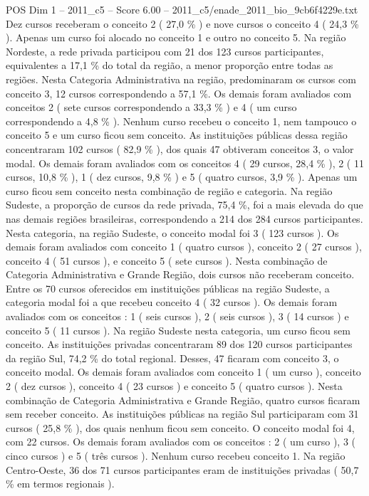 \begin{textsample}{POS Dim 1 – 2011\_c5 – Score 6.00 – 2011\_c5/enade\_2011\_bio\_9cb6f4229e.txt}
Dez cursos receberam o conceito 2 ( 27,0 \% ) e nove cursos o conceito 4 ( 24,3 \% ).
Apenas um curso foi alocado no conceito 1 e outro no conceito 5.
Na região Nordeste, a rede privada participou com 21 dos 123 cursos participantes, equivalentes a 17,1 \% do total da região, a menor proporção entre todas as regiões.
Nesta Categoria Administrativa na região, predominaram os cursos com conceito 3, 12 cursos correspondendo a 57,1 \%.
Os demais foram avaliados com conceitos 2 ( sete cursos correspondendo a 33,3 \% ) e 4 ( um curso correspondendo a 4,8 \% ).
Nenhum curso recebeu o conceito 1, nem tampouco o conceito 5 e um curso ficou sem conceito.
As instituições públicas dessa região concentraram 102 cursos ( 82,9 \% ), dos quais 47 obtiveram conceitos 3, o valor modal.
Os demais foram avaliados com os conceitos 4 ( 29 cursos, 28,4 \% ), 2 ( 11 cursos, 10,8 \% ), 1 ( dez cursos, 9,8 \% ) e 5 ( quatro cursos, 3,9 \% ).
Apenas um curso ficou sem conceito nesta combinação de região e categoria.
Na região Sudeste, a proporção de cursos da rede privada, 75,4 \%, foi a mais elevada do que nas demais regiões brasileiras, correspondendo a 214 dos 284 cursos participantes.
Nesta categoria, na região Sudeste, o conceito modal foi 3 ( 123 cursos ).
Os demais foram avaliados com conceito 1 ( quatro cursos ), conceito 2 ( 27 cursos ), conceito 4 ( 51 cursos ), e conceito 5 ( sete cursos ).
Nesta combinação de Categoria Administrativa e Grande Região, dois cursos não receberam conceito.
Entre os 70 cursos oferecidos em instituições públicas na região Sudeste, a categoria modal foi a que recebeu conceito 4 ( 32 cursos ).
Os demais foram avaliados com os conceitos : 1 ( seis cursos ), 2 ( seis cursos ), 3 ( 14 cursos ) e conceito 5 ( 11 cursos ).
Na região Sudeste nesta categoria, um curso ficou sem conceito.
As instituições privadas concentraram 89 dos 120 cursos participantes da região Sul, 74,2 \% do total regional.
Desses, 47 ficaram com conceito 3, o conceito modal.
Os demais foram avaliados com conceito 1 ( um curso ), conceito 2 ( dez cursos ), conceito 4 ( 23 cursos ) e conceito 5 ( quatro cursos ).
Nesta combinação de Categoria Administrativa e Grande Região, quatro cursos ficaram sem receber conceito.
As instituições públicas na região Sul participaram com 31 cursos ( 25,8 \% ), dos quais nenhum ficou sem conceito.
O conceito modal foi 4, com 22 cursos.
Os demais foram avaliados com os conceitos : 2 ( um curso ), 3 ( cinco cursos ) e 5 ( três cursos ).
Nenhum curso recebeu conceito 1.
Na região Centro-Oeste, 36 dos 71 cursos participantes eram de instituições privadas ( 50,7 \% em termos regionais ).

\end{textsample}
